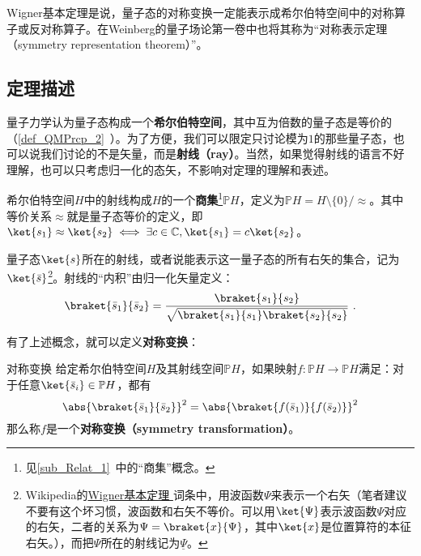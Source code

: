 





Wigner基本定理是说，量子态的对称变换一定能表示成希尔伯特空间中的对称算子或反对称算子。在Weinberg的量子场论第一卷\cite{WeinbergQFT1}中也将其称为“对称表示定理（symmetry representation theorem）”。

\subsection{定理描述}

量子力学认为量子态构成一个\textbf{希尔伯特空间}，其中互为倍数的量子态是等价的（\autoref{def_QMPrcp_2}~）。为了方便，我们可以限定只讨论模为$1$的那些量子态，也可以说我们讨论的不是矢量，而是\textbf{射线（ray）}。当然，如果觉得射线的语言不好理解，也可以只考虑归一化的态矢，不影响对定理的理解和表述。

希尔伯特空间$H$中的射线构成$H$的一个\textbf{商集}\footnote{见\autoref{sub_Relat_1}~中的“商集”概念。}$\mathbb{P}H$，定义为${\displaystyle \mathbb {P} H=H\setminus \{0\}/{\approx }}$。其中等价关系$\approx$就是量子态等价的定义，即$\ket{s_1}\approx\ket{s_2}\iff \exists c\in\mathbb{C}, \ket{s_1}=c\ket{s_2}$。

量子态$\ket{s}$所在的射线，或者说能表示这一量子态的所有右矢的集合，记为$\ket{\bar{s}}$\footnote{Wikipedia的\href{https://en.wikipedia.org/wiki/Wigner_theorem}{Wigner基本定理
}词条中，用波函数$\Psi$来表示一个右矢（笔者建议不要有这个坏习惯，波函数和右矢不等价。可以用$\ket{\Psi}$表示波函数$\Psi$对应的右矢，二者的关系为$\Psi=\braket{x}{\Psi}$，其中$\ket{x}$是位置算符的本征右矢。），而把$\Psi$所在的射线记为$\underline{\Psi}$。}。射线的“内积”由归一化矢量定义：
\begin{equation}
\braket{\bar{s}_1}{\bar{s}_2} = \frac{\braket{s_1}{s_2}}{\sqrt{\braket{s_1}{s_1}\braket{s_2}{s_2}}}~.
\end{equation}

有了上述概念，就可以定义\textbf{对称变换}：

\begin{definition}{对称变换}\label{def_WigThe_1}
给定希尔伯特空间$H$及其射线空间$\mathbb{P}H$，如果映射$f:\mathbb{P}H\to\mathbb{P}H$满足：对于任意$\ket{\bar{s}_i}\in\mathbb{P}H$，都有
\begin{equation}\label{eq_WigThe_1}
\abs{\braket{\bar{s}_1}{\bar{s}_2}}^2 = \abs{\braket{f(\bar{s}_1)}{f(\bar{s}_2)}}^2
\end{equation}
那么称$f$是一个\textbf{对称变换（symmetry transformation）}。
\end{definition}

